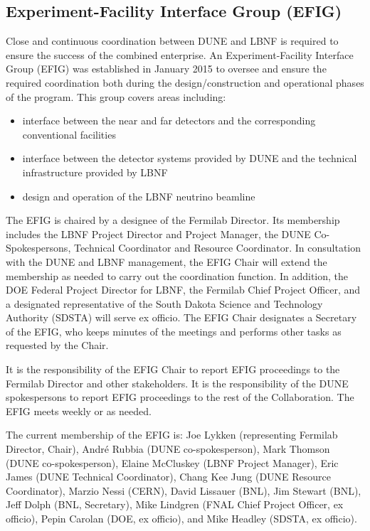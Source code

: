 \subsection{Experiment-Facility Interface Group (EFIG)}

Close and continuous coordination between DUNE and LBNF is
required to ensure the success of the combined enterprise.
An Experiment-Facility Interface Group (EFIG) was established
in January 2015 to oversee and ensure the required coordination
both during the design/construction and operational
phases of the program. This group covers areas including:
\begin{itemize}
\item  interface between the near and far detectors and the
corresponding conventional facilities
\item interface between the detector systems provided by
DUNE and the technical infrastructure provided by LBNF
\item design and operation of the LBNF neutrino beamline
\end{itemize}

The EFIG is chaired by a designee of the Fermilab Director.
Its membership includes the LBNF Project Director and Project Manager,
the DUNE Co-Spokespersons, Technical Coordinator and Resource Coordinator.
In consultation with the DUNE and LBNF management, the EFIG Chair will
extend the membership as needed %
to carry out the coordination
function. In addition, the DOE Federal Project Director for LBNF,
the Fermilab Chief Project Officer, and a designated representative
of the South Dakota Science and Technology Authority (SDSTA) will
serve ex officio. The EFIG Chair designates a Secretary of the EFIG,
who keeps minutes of the meetings and performs other tasks as
requested by the Chair.

It is the responsibility of the EFIG Chair to report EFIG proceedings
to the Fermilab Director and other stakeholders. It is the responsibility
of the DUNE spokespersons to report EFIG proceedings to the rest of
the Collaboration. The EFIG meets weekly or as needed.

The current membership of the EFIG is:
Joe Lykken (representing Fermilab Director, Chair),
Andr\'e Rubbia (DUNE co-spokesperson),
Mark Thomson (DUNE co-spokesperson),
Elaine McCluskey (LBNF Project Manager),
Eric James (DUNE Technical Coordinator),
Chang Kee Jung (DUNE Resource Coordinator),
Marzio Nessi (CERN),
David Lissauer (BNL),
Jim Stewart (BNL),
Jeff Dolph (BNL, Secretary),
Mike Lindgren (FNAL Chief Project Officer, ex officio),
Pepin Carolan (DOE, ex officio), and 
Mike Headley (SDSTA, ex officio).

